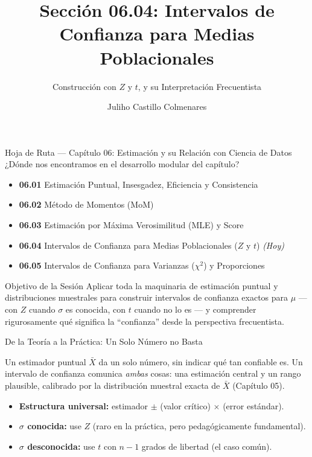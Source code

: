 \documentclass[10pt, aspectratio=169]{beamer}
\title[IC para Medias]{Sección 06.04: Intervalos de Confianza para Medias Poblacionales}
\subtitle{Construcción con $Z$ y $t$, y su Interpretación Frecuentista}
\author[J. Castillo Colmenares]{Juliho Castillo Colmenares}
\institute{Tecnológico de Monterrey}
\date{\vspace{-1.2cm}}
\begin{document}
\begin{frame}[plain]
  \vspace{-0.8cm}
  \titlepage
\end{frame}

\begin{frame}{Hoja de Ruta --- Capítulo 06: Estimación y su Relación con Ciencia de Datos}
  \footnotesize
  ¿Dónde nos encontramos en el desarrollo modular del capítulo? \pause
  \begin{itemize}\itemsep=0.08em
    \item \textbf{06.01} Estimación Puntual, Insesgadez, Eficiencia y Consistencia \pause
    \item \textbf{06.02} Método de Momentos (MoM) \pause
    \item \textbf{06.03} Estimación por Máxima Verosimilitud (MLE) y Score \pause
    \item \textbf{06.04} Intervalos de Confianza para Medias Poblacionales ($Z$ y $t$) \emph{(Hoy)} \pause
    \item \textbf{06.05} Intervalos de Confianza para Varianzas ($\chi^2$) y Proporciones
  \end{itemize}
  \vspace{-0.05cm}
  \begin{block}{Objetivo de la Sesión}
    Aplicar toda la maquinaria de estimación puntual y distribuciones muestrales para construir intervalos de confianza exactos para $\mu$ --- con $Z$ cuando $\sigma$ es conocida, con $t$ cuando no lo es --- y comprender rigurosamente qué significa la ``confianza'' desde la perspectiva frecuentista.
  \end{block}
\end{frame}

\begin{frame}{De la Teoría a la Práctica: Un Solo Número no Basta}
  \footnotesize
  \begin{motivacion}
    Un estimador puntual $\bar X$ da un solo número, sin indicar qué tan confiable es. Un intervalo de confianza comunica \emph{ambas} cosas: una estimación central y un rango plausible, calibrado por la distribución muestral exacta de $\bar X$ (Capítulo 05).
  \end{motivacion}

  \vspace{0.15cm}
  \pause
  \begin{itemize}\itemsep=0.1cm
    \item \textbf{Estructura universal:} estimador $\pm$ (valor crítico) $\times$ (error estándar). \pause
    \item \textbf{$\sigma$ conocida:} use $Z$ (raro en la práctica, pero pedagógicamente fundamental). \pause
    \item \textbf{$\sigma$ desconocida:} use $t$ con $n-1$ grados de libertad (el caso común).
  \end{itemize}
\end{frame}
\end{document}
